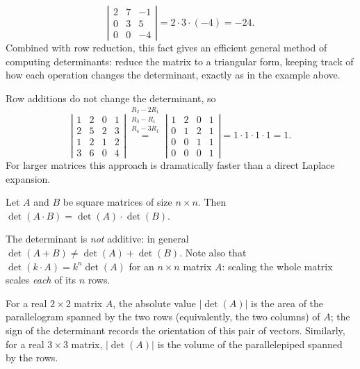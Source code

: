 \begin{example}
\[
\left| \begin{array}{ccc} 2 & 7 & -1\\ 0 & 3 & 5\\ 0 & 0 & -4 \end{array} \right| = 2\cdot 3\cdot (-4) = -24.
\]
Combined with row reduction, this fact gives an efficient general method of computing determinants: reduce
the matrix to a triangular form, keeping track of how each operation changes the determinant, exactly as in
the example above.
\end{example}

\begin{example}
Row additions do not change the determinant, so
\[
\left| \begin{array}{cccc}
1 & 2 & 0 & 1\\ 2 & 5 & 2 & 3\\ 1 & 2 & 1 & 2\\ 3 & 6 & 0 & 4
\end{array} \right|
\overset{\substack{R_2-2R_1\\ R_3-R_1\\ R_4-3R_1}}{=}
\left| \begin{array}{cccc}
1 & 2 & 0 & 1\\ 0 & 1 & 2 & 1\\ 0 & 0 & 1 & 1\\ 0 & 0 & 0 & 1
\end{array} \right| = 1\cdot 1\cdot 1\cdot 1 = 1.
\]
For larger matrices this approach is dramatically faster than a direct Laplace expansion.
\end{example}

\begin{fact}[Multiplicativity]
Let $A$ and $B$ be square matrices of size $n\times n$. Then $\det(A\cdot B) = \det(A)\cdot \det(B)$.
\end{fact}

\begin{warning}
The determinant is \emph{not} additive: in general $\det(A+B)\neq \det(A)+\det(B)$. Note also that
$\det(k\cdot A) = k^n\det(A)$ for an $n\times n$ matrix $A$: scaling the whole matrix scales \emph{each} of
its $n$ rows.
\end{warning}

\begin{remark}
For a real $2\times 2$ matrix $A$, the absolute value $|\det(A)|$ is the area of the parallelogram spanned
by the two rows (equivalently, the two columns) of $A$; the sign of the determinant records the orientation
of this pair of vectors. Similarly, for a real $3\times 3$ matrix, $|\det(A)|$ is the volume of the
parallelepiped spanned by the rows.
\end{remark}

